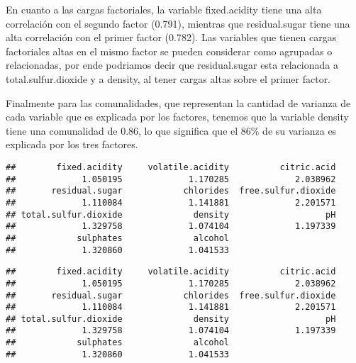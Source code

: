\documentclass[
]{article}
\newenvironment{Shaded}{\begin{snugshade}}{\end{snugshade}}
\newcommand{\ControlFlowTok}[1]{\textcolor[rgb]{0.13,0.29,0.53}{\textbf{#1}}}
\newcommand{\DecValTok}[1]{\textcolor[rgb]{0.00,0.00,0.81}{#1}}
\newcommand{\FunctionTok}[1]{\textcolor[rgb]{0.13,0.29,0.53}{\textbf{#1}}}
\newcommand{\NormalTok}[1]{#1}
\newcommand{\OtherTok}[1]{\textcolor[rgb]{0.56,0.35,0.01}{#1}}
\newcommand{\SpecialCharTok}[1]{\textcolor[rgb]{0.81,0.36,0.00}{\textbf{#1}}}
\begin{document}
En cuanto a las cargas factoriales, la variable fixed.acidity tiene una
alta correlación con el segundo factor (0.791), mientras que
residual.sugar tiene una alta correlación con el primer factor (0.782).
Las variables que tienen cargas factoriales altas en el mismo factor se
pueden considerar como agrupadas o relacionadas, por ende podriamos
decir que residual.sugar esta relacionada a total.sulfur.dioxide y a
density, al tener cargas altas sobre el primer factor.

Finalmente para las comunalidades, que representan la cantidad de
varianza de cada variable que es explicada por los factores, tenemos que
la variable density tiene una comunalidad de 0.86, lo que significa que
el 86\% de su varianza es explicada por los tres factores.

\begin{Shaded}
\end{Shaded}

\begin{verbatim}
##        fixed.acidity     volatile.acidity          citric.acid 
##             1.050195             1.170285             2.038962 
##       residual.sugar            chlorides  free.sulfur.dioxide 
##             1.110084             1.141881             2.201571 
## total.sulfur.dioxide              density                   pH 
##             1.329758             1.074104             1.197339 
##            sulphates              alcohol 
##             1.320860             1.041533
\end{verbatim}

\begin{Shaded}
\end{Shaded}

\begin{verbatim}
##        fixed.acidity     volatile.acidity          citric.acid 
##             1.050195             1.170285             2.038962 
##       residual.sugar            chlorides  free.sulfur.dioxide 
##             1.110084             1.141881             2.201571 
## total.sulfur.dioxide              density                   pH 
##             1.329758             1.074104             1.197339 
##            sulphates              alcohol 
##             1.320860             1.041533
\end{verbatim}
\end{document}
